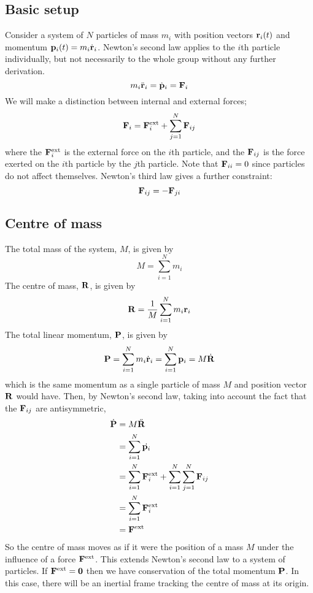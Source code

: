 \subsection{Basic setup}
Consider a system of \(N\) particles of mass \(m_i\) with position vectors \(\vb r_i(t)\) and momentum \(\vb p_i(t) = m_i \dot {\vb r}_i\).
Newton's second law applies to the \(i\)th particle individually, but not necessarily to the whole group without any further derivation.
\[
	m_i \ddot{\vb{r}}_i = \dot{\vb p}_i = \vb F_i
\]
We will make a distinction between internal and external forces;
\[
	\vb F_i = \vb F_i^\text{ext} + \sum_{j = 1}^N \vb F_{ij}
\]
where the \(\vb F_i^\text{ext}\) is the external force on the \(i\)th particle, and the \(\vb F_{ij}\) is the force exerted on the \(i\)th particle by the \(j\)th particle.
Note that \(\vb F_{ii} = 0\) since particles do not affect themselves.
Newton's third law gives a further constraint:
\[
	\vb F_{ij} = -\vb F_{ji}
\]

\subsection{Centre of mass}
The total mass of the system, \(M\), is given by
\[
	M = \sum_{i=1}^N m_i
\]
The centre of mass, \(\vb R\), is given by
\[
	\vb R = \frac{1}{M} \sum_{i=1}^N m_i \vb r_i
\]
The total linear momentum, \(\vb P\), is given by
\[
	\vb P = \sum_{i=1}^N m_i \dot{\vb{r}}_i = \sum_{i=1}^N \vb p_i = M\dot{\vb R}
\]
which is the same momentum as a single particle of mass \(M\) and position vector \(\vb R\) would have.
Then, by Newton's second law, taking into account the fact that the \(\vb F_{ij}\) are antisymmetric,
\begin{align*}
	\dot{\vb P} & = M \ddot{\vb R}                                                         \\
	            & = \sum_{i=1}^N \dot{\vb p_i}                                             \\
	            & = \sum_{i=1}^N \vb F_i^\text{ext} + \sum_{i=1}^N \sum_{j=1}^N \vb F_{ij} \\
	            & = \sum_{i=1}^N \vb F_i^\text{ext}                                        \\
	            & = \vb F^\text{ext}
\end{align*}
So the centre of mass moves as if it were the position of a mass \(M\) under the influence of a force \(\vb F^\text{ext}\).
This extends Newton's second law to a system of particles.
If \(\vb F^\text{ext} = \vb 0\) then we have conservation of the total momentum \(\vb P\).
In this case, there will be an inertial frame tracking the centre of mass at its origin.

